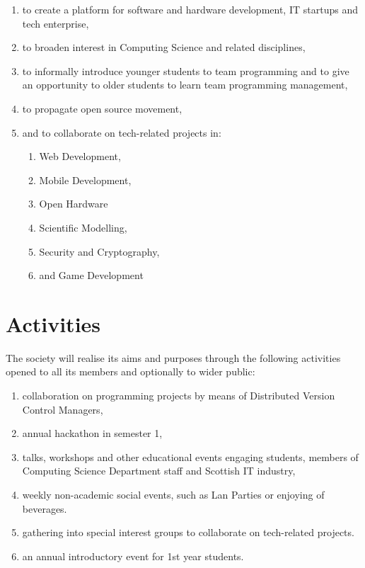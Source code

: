 \documentclass{report}
\begin{document}
		\begin{enumerate}
			\item{to create a platform for software and hardware development, IT startups and tech enterprise,}
			\item{to broaden interest in Computing Science and related disciplines,}
			\item{to informally introduce younger students to team programming and to give an opportunity to older students to learn team programming management,}
			\item{to propagate open source movement,} 
			\item{and to collaborate on tech-related projects in:

				\begin{enumerate}
					\item{Web Development,}
					\item{Mobile Development,}
					\item{Open Hardware}
					\item{Scientific Modelling,}
					\item{Security and Cryptography,}
					\item{and Game Development}
				\end{enumerate}	
			}

		\end{enumerate}

	\section{Activities}

		The society will realise its aims and purposes through the following activities opened to all its members and optionally to wider public:

		\begin{enumerate}
			\item{collaboration on programming projects by means of Distributed Version Control Managers,}
			\item{annual hackathon in semester 1,}
			\item{talks, workshops and other educational events engaging students, members of Computing Science Department staff and Scottish IT industry,}
			\item{weekly non-academic social events, such as Lan Parties or enjoying of beverages.}
			\item{gathering into special interest groups to collaborate on tech-related projects.}
			\item{an annual introductory event for 1st year students.}
		\end{enumerate}
\end{document}
